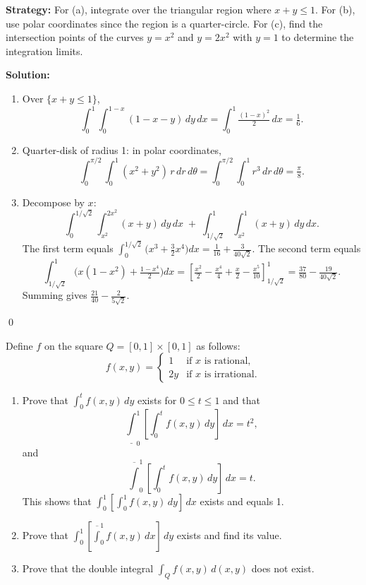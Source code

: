 \noindent\textbf{Strategy:} For (a), integrate over the triangular region where $x+y\leq 1$. For (b), use polar coordinates since the region is a quarter-circle. For (c), find the intersection points of the curves $y=x^2$ and $y=2x^2$ with $y=1$ to determine the integration limits.

\bigskip\noindent\textbf{Solution:}
\begin{enumerate}[label=(\alph*)]
    \item Over $\{x+y\le 1\}$,
    \[ \int_0^1 \!\int_0^{1-x} (1-x-y)\,dy\,dx = \int_0^1 \tfrac{(1-x)^2}{2}\,dx = \tfrac{1}{6}. \]
    \item Quarter-disk of radius 1: in polar coordinates,
    \[ \int_0^{\pi/2}\!\int_0^1 (x^2+y^2)\,r\,dr\,d\theta = \int_0^{\pi/2}\!\int_0^1 r^3\,dr\,d\theta = \tfrac{\pi}{8}. \]
    \item Decompose by $x$:
    \[ \int_0^{1/\sqrt{2}} \!\int_{x^2}^{2x^2} (x+y)\,dy\,dx\; +\; \int_{1/\sqrt{2}}^{1} \!\int_{x^2}^{1} (x+y)\,dy\,dx. \]
    The first term equals $\int_0^{1/\sqrt{2}} \big(x^3+\tfrac{3}{2}x^4\big)dx= \tfrac{1}{16}+\tfrac{3}{40\sqrt{2}}$. The second term equals
    \[ \int_{1/\sqrt{2}}^{1} \Big(x(1-x^2)+\tfrac{1-x^4}{2}\Big)dx = \left[\tfrac{x^2}{2}-\tfrac{x^4}{4}+\tfrac{x}{2}-\tfrac{x^5}{10}\right]_{1/\sqrt{2}}^{1} = \tfrac{37}{80}-\tfrac{19}{40\sqrt{2}}. \]
    Summing gives $\tfrac{21}{40}-\tfrac{2}{5\sqrt{2}}$.
\end{enumerate}\qed


\begin{problembox}
\begin{problemstatement}
Define \( f \) on the square \( Q = [0, 1] \times [0, 1] \) as follows:
\[ f(x, y) = 
\begin{cases} 
1 & \text{if } x \text{ is rational}, \\
2y & \text{if } x \text{ is irrational}. 
\end{cases} \]
\begin{enumerate}[label=(\alph*)]
    \item Prove that \( \int_{0}^{t} f(x, y) \, dy \) exists for \( 0 \leq t \leq 1 \) and that
    \[ \underline\int_{0}^{1} \left[ \int_{0}^{t} f(x, y) \, dy \right] \, dx = t^2, \]
    and \[ \overline\int_{0}^{1} \left[ \int_{0}^{t} f(x, y) \, dy \right] \, dx = t. \]
    This shows that \( \int_{0}^{1} \left[ \int_{0}^{1} f(x, y) \, dy \right] \, dx \) exists and equals 1.
    
    \item Prove that \( \int_{0}^{1} \left[ \overline\int_{0}^{1} f(x, y) \, dx \right] \, dy \) exists and find its value.
    \item Prove that the double integral \( \int_{Q} f(x, y) \, d(x, y) \) does not exist.
\end{enumerate}
\end{problemstatement}
\end{problembox}


